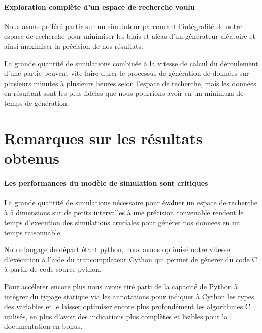 		\paragraph{Exploration complète d'un espace de recherche voulu}
		
		\begin{result}
			Nous avons préféré partir sur un simulateur parcourant l'intégralité de notre espace de recherche pour minimiser les biais et aléas d'un générateur aléatoire et ainsi maximiser la précision de nos résultats.
		\end{result}
		
		La grande quantité de simulations combinée à la vitesse de calcul du déroulement d'une partie peuvent vite faire durer le processus de génération de données sur plusieurs minutes à plusieurs heures selon l'espace de recherche, mais les données en résultant sont les plus fidèles que nous pourrions avoir en un minimum de temps de génération. 
	
		
	\section{Remarques sur les résultats obtenus}
	
		\paragraph{Les performances du modèle de simulation sont critiques}
		La grande quantité de simulations nécessaire pour évaluer un espace de recherche à 5 dimensions sur de petits intervalles à une précision convenable rendent le temps d'execution des simulations cruciales pour générer nos données en un temps raisonnable.
		
		
		Notre langage de départ étant python, nous avons optimisé notre vitesse d'exécution à l'aide du trancompilateur Cython qui permet de génerer du code C à partir de code source python.
		
		Pour accélerer encore plus nous avons tiré parti de la capacité de Python à intégrer du typage statique via les annotations pour indiquer à Cython les types des variables et le laisser optimiser encore plus profondément les algorithmes C utilisés, en plus d'avoir des indications plus complètes et lisibles pour la documentation en bonus.
		
		
		
